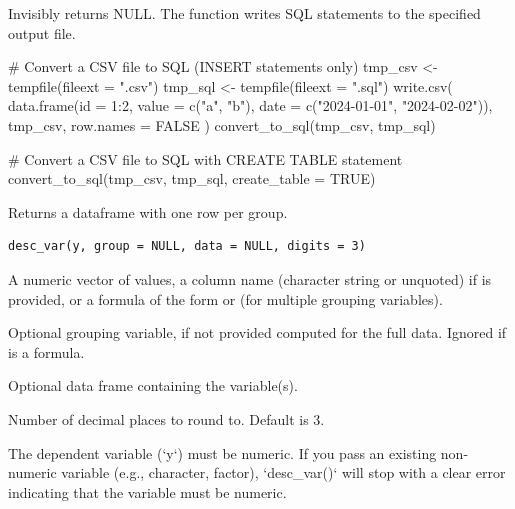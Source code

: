 \documentclass[a4paper]{book}
\begin{document}
%
\begin{Value}
Invisibly returns NULL. The function writes SQL statements to the
specified output file.
\end{Value}
%
\begin{Examples}
\begin{ExampleCode}
# Convert a CSV file to SQL (INSERT statements only)
tmp_csv <- tempfile(fileext = ".csv")
tmp_sql <- tempfile(fileext = ".sql")
write.csv(
  data.frame(id = 1:2, value = c("a", "b"), date = c("2024-01-01", "2024-02-02")),
  tmp_csv,
  row.names = FALSE
)
convert_to_sql(tmp_csv, tmp_sql)

# Convert a CSV file to SQL with CREATE TABLE statement
convert_to_sql(tmp_csv, tmp_sql, create_table = TRUE)

\end{ExampleCode}
\end{Examples}
%
\begin{Description}
Returns a dataframe with one row per group.
\end{Description}
%
\begin{Usage}
\begin{verbatim}
desc_var(y, group = NULL, data = NULL, digits = 3)
\end{verbatim}
\end{Usage}
%
\begin{Arguments}
\begin{ldescription}
\item[\code{y}] A numeric vector of values, a column name (character string or unquoted) if  is provided,
or a formula of the form  or  (for multiple grouping variables).

\item[\code{group}] Optional grouping variable, if not provided computed for the full data.
Ignored if  is a formula.

\item[\code{data}] Optional data frame containing the variable(s).

\item[\code{digits}] Number of decimal places to round to. Default is 3.
\end{ldescription}
\end{Arguments}
%
\begin{Details}
The dependent variable (`y`) must be numeric. If you pass an existing
non-numeric variable (e.g., character, factor), `desc\_var()` will stop with
a clear error indicating that the variable must be numeric.
\end{Details}
\end{document}
